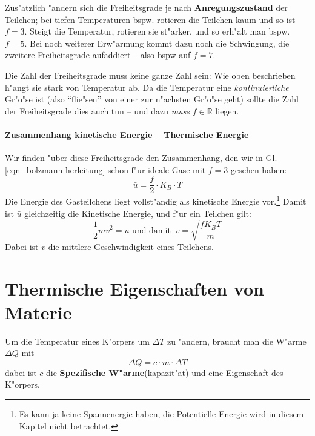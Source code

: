 Zus"atzlich "andern sich die Freiheitsgrade je nach
\textbf{Anregungszustand} der Teilchen; bei tiefen Temperaturen
bspw. rotieren die Teilchen kaum und so ist $f = 3$. Steigt die
Temperatur, rotieren sie st"arker, und so erh"alt man bspw. $f =
5$. Bei noch weiterer Erw"armung kommt dazu noch die Schwingung, die
zweitere Freiheitsgrade aufaddiert -- also bspw auf $f = 7$.

Die Zahl der Freiheitsgrade muss keine ganze Zahl sein: Wie oben
beschrieben h"angt sie stark von Temperatur ab. Da die Temperatur eine
\emph{kontinuierliche} Gr"o"se ist (also "`flie"sen"' von einer zur
n"achsten Gr"o"se geht) sollte die Zahl der Freiheitsgrade dies auch tun
-- und dazu \emph{muss} $f \in \mathbb R$ liegen. 


\paragraph{Zusammenhang kinetische Energie -- Thermische Energie}
\label{kap_zusammenhang-kinetische-energie-thermische}

Wir finden "uber diese Freiheitsgrade den Zusammenhang, den wir in
Gl. \eqref{eqn_bolzmann-herleitung} schon f"ur ideale Gase mit $f = 3$
gesehen haben:
\begin{equation}
   \label{eqn_kinetische-energie}
   \boxed{ \bar u = \frac{f}{2} \cdot K_B \cdot T }
\end{equation}
Die Energie des Gasteilchens liegt vollst"andig als kinetische Energie
vor.\footnote{Es kann ja keine Spannenergie haben, die Potentielle Energie wird
in diesem Kapitel nicht betrachtet.} Damit ist $\bar u$ gleichzeitig
die Kinetische Energie, und f"ur ein Teilchen gilt:
\begin{equation}
   \label{eq:434}
   \frac{1}{2} m \bar v^2 = \bar u \text{ und damit } ~ \bar v =
   \sqrt{\frac{f K_B T}{m}}
\end{equation}
Dabei ist $\bar v$ die mittlere Geschwindigkeit eines Teilchens.





\section{Thermische Eigenschaften von Materie}
\label{kap_thermische-eigenschaften-von-materie}

\begin{Def}
   Um die Temperatur eines K"orpers um $\Delta T$ zu "andern, braucht
   man die W"arme $\Delta Q$ mit
   \begin{equation}
      \label{eqn_spez-waerme}
      \boxed{\Delta Q = c \cdot m \cdot \Delta T}
   \end{equation}
   dabei ist $c$ die \textbf{Spezifische W"arme}(kapazit"at) und eine
   Eigenschaft des K"orpers.
\end{Def}


